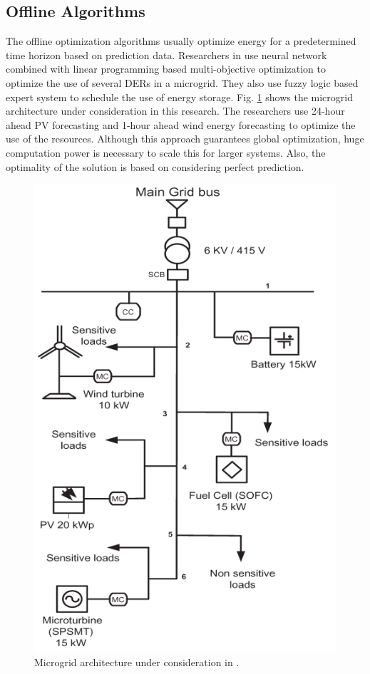 \subsection{Offline Algorithms}
The offline optimization algorithms usually optimize energy for a predetermined time horizon based on prediction data. Researchers in \cite{ACh13} use neural network combined with linear programming based multi-objective optimization to optimize the use of several DERs in a microgrid. They also use fuzzy logic based expert system to schedule the use of energy storage. Fig. \ref{fig:OFF_1} shows the microgrid architecture under consideration in this research. The researchers use 24-hour ahead PV forecasting and 1-hour ahead wind energy forecasting to optimize the use of the resources. Although this approach guarantees global optimization, huge computation power is necessary to scale this for larger systems. Also, the optimality of the solution is based on considering perfect prediction.

\begin{figure}[!h]
\centering
\includegraphics[width=0.5\linewidth, angle = 90]{figs/OFF_1.png}
\caption[Microgrid architecture under consideration]{Microgrid architecture under consideration in \cite{ACh13}.}
\label{fig:OFF_1}
\end{figure}


